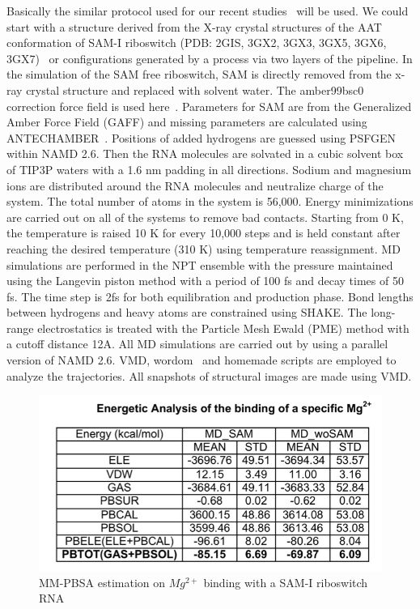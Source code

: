 \documentclass[a4paper,10pt]{article}
\begin{document}
Basically the similar protocol used for our recent studies~\cite{SAM-I-NAR2009, presentations} will be used.  We could start with a structure derived from the X-ray crystal structures of the AAT conformation of SAM-I riboswitch (PDB: 2GIS, 3GX2, 3GX3, 3GX5, 3GX6, 3GX7)~\cite{montange} or configurations generated by a process via two layers of the pipeline. In the simulation of the SAM free riboswitch, SAM is directly removed from the x-ray crystal structure and replaced with solvent water. The amber99bsc0 correction force field is used here~\cite{alberto}. Parameters for SAM are from the Generalized Amber Force Field (GAFF) and missing parameters are calculated using ANTECHAMBER~\cite{wang}. Positions of added hydrogens are guessed using PSFGEN within NAMD 2.6. Then the RNA molecules are solvated in a cubic solvent box of TIP3P waters with a 1.6 nm padding in all directions. Sodium and magnesium ions are distributed around the RNA molecules and neutralize charge of the system. The total number of atoms in the system is 56,000. Energy minimizations are carried out on all of the systems to remove bad contacts. Starting from 0 K, the temperature is raised 10 K for every 10,000 steps and is held constant after reaching the desired temperature (310 K) using temperature reassignment. MD simulations are performed in the NPT ensemble with the pressure maintained using the Langevin piston method with a period of 100 fs and decay times of 50 fs. The time step is 2fs for both equilibration and production phase. Bond lengths between hydrogens and heavy atoms are constrained using SHAKE. The long-range electrostatics is treated with the Particle Mesh Ewald (PME) method with a cutoff distance 12A.  All MD simulations are carried out by using a parallel version of NAMD 2.6.  VMD, wordom~\cite{moe} and homemade scripts are employed to analyze the trajectories. All snapshots of structural images are made using VMD.

\begin{figure}
\begin{center}
  \includegraphics[scale=0.4]{mm-pbsa-mg}
   \caption{MM-PBSA estimation on ${Mg^{2+}}$ binding with a SAM-I riboswitch RNA}
\end{center}
\label{fig:mm-pbsa-mg-table}
\end{figure}
\end{document}
